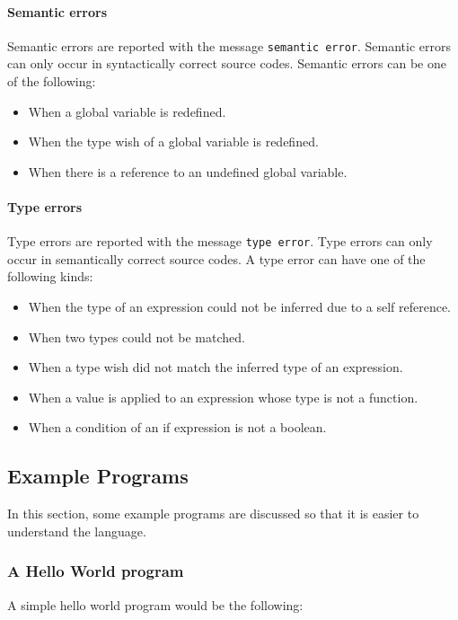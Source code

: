 \documentclass[12pt]{article}
\begin{document}
\paragraph{Semantic errors} Semantic errors are reported with the message
\verb$semantic error$. Semantic errors can only occur in syntactically correct
source codes. Semantic errors can be one of the following:
\begin{itemize}
    \item When a global variable is redefined.
    \item When the type wish of a global variable is redefined.
    \item When there is a reference to an undefined global variable. 
\end{itemize}

\paragraph{Type errors} Type errors are reported with the message
\verb$type error$. Type errors can only occur in semantically correct source
codes. A type error can have one of the following kinds:
\begin{itemize}
    \item When the type of an expression could not be inferred due to a self
        reference.
    \item When two types could not be matched.
    \item When a type wish did not match the inferred type of an expression.
    \item When a value is applied to an expression whose type is not a function.
    \item When a condition of an if expression is not a boolean.
\end{itemize}

\subsection{Example Programs}
\lstset{numbers=left}

In this section, some example programs are discussed so that it is easier to
understand the language.

\subsubsection{A Hello World program}

A simple hello world program would be the following:

\end{document}
